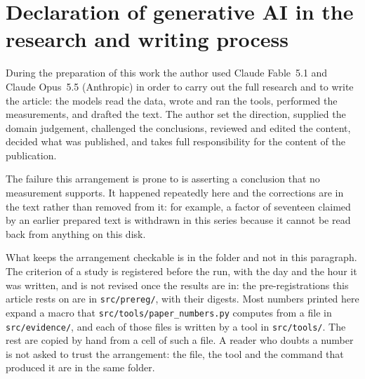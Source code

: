 \section*{Declaration of generative AI in the research and writing process}

During the preparation of this work the author used Claude Fable~5.1 and Claude Opus~5.5 (Anthropic) in order
to carry out the full research and to write the article: the models read the data, wrote and ran the tools,
performed the measurements, and drafted the text. The author set the direction,
supplied the domain judgement, challenged the conclusions, reviewed and edited the content,
decided what was published, and takes full responsibility for the content of the publication.

The failure this arrangement is prone to is asserting a conclusion that no measurement supports.
It happened repeatedly here and the corrections are in the text rather than removed from it: for
example, a factor of seventeen claimed by an earlier prepared text is withdrawn in this series
because it cannot be read back from anything on this disk.

What keeps the arrangement checkable is in the folder and not in this paragraph. The criterion of
a study is registered before the run, with the day and the hour it was written, and is not revised
once the results are in: the pre-registrations this article rests on are in \texttt{src/prereg/},
with their digests. Most numbers printed here expand a macro that \texttt{src/tools/paper\_numbers.py}
computes from a file in \texttt{src/evidence/}, and each of those files is written by a tool in
\texttt{src/tools/}. The rest are copied by hand from a cell of such a file. A reader who doubts a number is not asked to
trust the arrangement: the file, the tool and the command that produced it are in the same folder.
